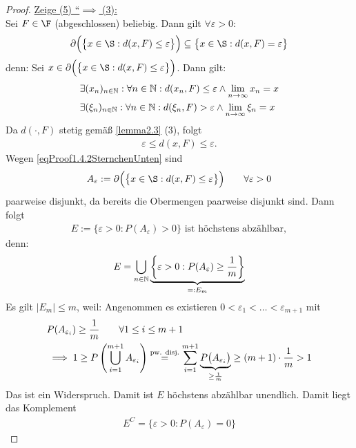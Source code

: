 \begin{proof}
\underline{Zeige (5) ``$\implies$ (3):}\\
Sei $F\in\F$ (abgeschlossen) beliebig. Dann gilt $\forall\varepsilon>0:$
\begin{align}\label{eqProof1.4.2SternchenUnten}
\partial\Big(\big\lbrace x\in\S:d(x,F)\leq\varepsilon\big\rbrace\Big)
\subseteq\big\lbrace x\in\S:d(x,F)=\varepsilon\big\rbrace
\end{align}
denn: Sei $x\in\partial\Big(\big\lbrace x\in\S:d(x,F)\leq\varepsilon\big\rbrace\Big)$. Dann gilt:
\begin{align*}
&\exists (x_n)_{n\in\mathbb{N}}:\forall n\in\mathbb{N}:d(x_n,F)\leq\varepsilon\wedge \lim\limits_{n\to\infty} x_n=x\\
&\exists (\xi_n)_{n\in\mathbb{N}}:\forall n\in\mathbb{N}:d(\xi_n,F)>\varepsilon\wedge\lim\limits_{n\to\infty}\xi_n=x
\end{align*}
Da $d(\cdot,F)$ stetig gemäß \ref{lemma2.3} (3), folgt
\begin{align*}
\varepsilon\leq d(x,F)\leq\varepsilon.
\end{align*}
Wegen \eqref{eqProof1.4.2SternchenUnten} sind 
\begin{align*}
A_\varepsilon:=\partial\Big(\big\lbrace x\in\S:d(x,F)\leq\varepsilon\big\rbrace\Big)\qquad\forall\varepsilon>0
\end{align*}
paarweise disjunkt, da bereits die Obermengen paarweise disjunkt sind. Dann folgt
\begin{align}\label{eqProof1.4.2DoppelSternchenUnten}
E:=\big\lbrace\varepsilon>0:P(A_\varepsilon)>0\big\rbrace\text{ ist höchstens abzählbar},
\end{align}
denn:
\begin{align*}
E=\bigcup\limits_{n\in\mathbb{N}}\underbrace{\left\lbrace\varepsilon>0:P(A_\varepsilon)\geq\frac{1}{m}\right\rbrace}_{=:E_m}
\end{align*}
Es gilt $|E_m|\leq m$, weil: Angenommen es existieren $0<\varepsilon_1<\ldots<\varepsilon_{m+1}$ mit 
\begin{align*}
&P(A_{\varepsilon_i})\geq\frac{1}{m}\qquad\forall 1\leq i\leq m+1\\
&\implies
1\geq P\left(\bigcup\limits_{i=1}^{m+1} A_{\varepsilon_i}\right)
\stackrel{\text{pw. disj.}}{=}
\sum\limits_{i=1}^{m+1}\underbrace{P\big(A_{\varepsilon_i}\big)}_{\geq\frac{1}{m}}\geq(m+1)\cdot\frac{1}{m}>1
\end{align*}
Das ist ein Widerspruch. Damit ist $E$ höchstens abzählbar unendlich. Damit liegt das Komplement
\begin{align*}
E^C=\big\lbrace\varepsilon>0: P(A_\varepsilon)=0\big\rbrace
\end{align*}

\end{proof}

